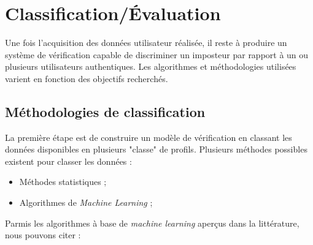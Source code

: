 \section{Classification/Évaluation}

Une fois l'acquisition des données utilisateur réalisée, il reste à produire un système de vérification capable de discriminer un imposteur par rapport à un ou plusieurs utilisateurs authentiques. Les algorithmes et méthodologies utilisées varient en fonction des objectifs recherchés.

\subsection{Méthodologies de classification}

La première étape est de construire un modèle de vérification en classant les données disponibles en plusieurs "classe" de profils. Plusieurs méthodes possibles existent pour classer les données :\\

\begin{itemize}
	\item Méthodes statistiques ;
	\item Algorithmes de \textit{Machine Learning} ;\\
\end{itemize}

Parmis les algorithmes à base de \textit{machine learning} aperçus dans la littérature, nous pouvons citer :\\

